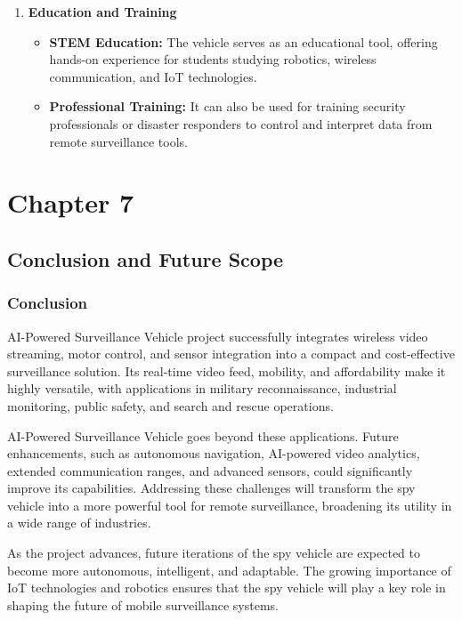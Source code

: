 \documentclass[12pt,a4paper]{report}
\begin{document}
\begin{enumerate}
    \item \textbf{Education and Training}
    \begin{itemize}
        \item \textbf{STEM Education:} The vehicle serves as an educational tool, offering hands-on experience for students studying robotics, wireless communication, and IoT technologies.
        \item \textbf{Professional Training:} It can also be used for training security professionals or disaster responders to control and interpret data from remote surveillance tools.
    \end{itemize}
\end{enumerate}







	{\vfill \chapter*{\centering \vfill Chapter 7 \vfill}\vfill}
	\thispagestyle{empty}
	\newpage
	\label{Conclusion and Future Scope}
	\section{Conclusion and Future Scope}


\label{Conclusion}
\subsection{Conclusion}
AI-Powered Surveillance Vehicle project successfully integrates wireless video streaming, motor control, and sensor integration into a compact and cost-effective surveillance solution. Its real-time video feed, mobility, and affordability make it highly versatile, with applications in military reconnaissance, industrial monitoring, public safety, and search and rescue operations.

AI-Powered Surveillance Vehicle goes beyond these applications. Future enhancements, such as autonomous navigation, AI-powered video analytics, extended communication ranges, and advanced sensors, could significantly improve its capabilities. Addressing these challenges will transform the spy vehicle into a more powerful tool for remote surveillance, broadening its utility in a wide range of industries.

As the project advances, future iterations of the spy vehicle are expected to become more autonomous, intelligent, and adaptable. The growing importance of IoT technologies and robotics ensures that the spy vehicle will play a key role in shaping the future of mobile surveillance systems.
\end{document}
